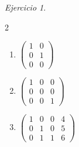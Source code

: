 \documentclass[12pt]{article}
\theoremstyle{remark}
\newtheorem{Ejer}[definicion]{Ejercicio}
\begin{document}
\begin{Ejer}
\begin{multicols}{2}
\begin{enumerate}[resume]
\item $\begin{pmatrix}1&0\\0&1\\0&0\end{pmatrix}$
\item $\begin{pmatrix}1&0&0\\0&0&0\\0&0&1\end{pmatrix}$
\item $\begin{pmatrix}1&0&0&4\\0&1&0&5\\0&1&1&6\end{pmatrix}$
\end{enumerate}
\end{multicols}
\end{Ejer}
\end{document}
